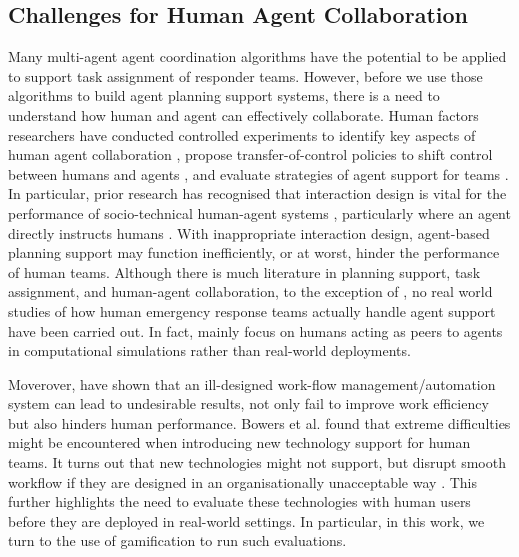 \subsection{Challenges for Human Agent Collaboration}\label{sec:challenges}
Many multi-agent agent coordination algorithms have the potential to be applied to support task assignment of responder teams. However, before we use those algorithms to build agent planning support systems, there is a need to understand how human and agent can effectively collaborate.  Human factors researchers have conducted controlled experiments to identify key aspects of human agent collaboration \cite{Bradshaw2011,Cooke2006,Sukthankar,Wagner2004}, propose transfer-of-control policies to shift control between humans and agents \cite{scerri:etal:2005},  and evaluate strategies of agent support for teams \cite{Lenox2000}. In particular, prior research has recognised that interaction design is vital for the performance of socio-technical human-agent systems \cite{Rachlin1997}, particularly where an agent directly instructs humans \cite{Moran2013}. With inappropriate interaction design, agent-based planning support may function inefficiently, or at worst, hinder the performance of human teams. Although there is much literature in planning support, task assignment, and human-agent collaboration, to the exception of \cite{machinetta,XXX}, no real world studies of how human emergency response teams  actually handle agent support  have been carried out.  In fact, \cite{machinetta,XXX} mainly focus on humans acting as peers to agents in computational simulations rather than real-world deployments.

Moverover, \cite{Bowers1994} have shown that an ill-designed work-flow management/automation system can lead to undesirable results, not only fail to improve work efficiency but also hinders human performance. Bowers et al. found that extreme difficulties might be encountered when introducing new technology support for human teams. It turns out that new technologies might not support, but  disrupt smooth workflow if they are designed in an organisationally unacceptable way \cite{Abbott1994}. This further highlights the need to evaluate these technologies with human users before they are deployed in real-world settings. In particular, in this work, we turn to the use of gamification to run such evaluations. 


